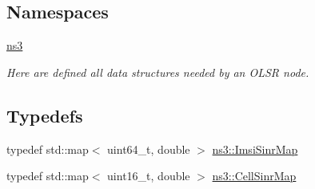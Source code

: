\subsection*{Namespaces}
\begin{DoxyCompactItemize}
\item 
 \hyperlink{namespacens3}{ns3}
\begin{DoxyCompactList}\small\item\em Here are defined all data structures needed by an O\+L\+SR node. \end{DoxyCompactList}\end{DoxyCompactItemize}
\subsection*{Typedefs}
\begin{DoxyCompactItemize}
\item 
typedef std\+::map$<$ uint64\+\_\+t, double $>$ \hyperlink{namespacens3_ab6cc151fead3de33fa35b3fdd609a633}{ns3\+::\+Imsi\+Sinr\+Map}
\item 
typedef std\+::map$<$ uint16\+\_\+t, double $>$ \hyperlink{namespacens3_a1a41652a34d3ad5a6fb5d9a0f57e29f8}{ns3\+::\+Cell\+Sinr\+Map}
\end{DoxyCompactItemize}
